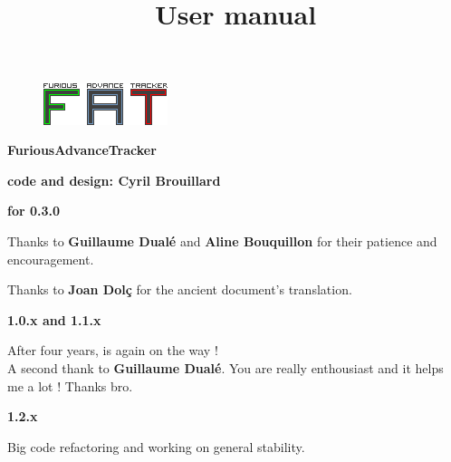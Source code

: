 \documentclass[12pt,a4paper]{article}
\title{\bf \SimpleImage{images/furicat_color}{0.3} \\ User manual}
\author{\fatversion}
\begin{document}
  \begin{figure}
    \begin{center}
    \includegraphics[scale=2]{images/logo}
    \end{center}
  \end{figure}
  \maketitle{}
  \thispagestyle{empty}
  \setcounter{page}{0}
  \ClearShipoutPicture

  \newpage

  \begin{center}

  {\bf \FAT FuriousAdvanceTracker} \medskip

  {\bf code and design: Cyril Brouillard} \medskip

  {\bf for 0.3.0} \medskip

  Thanks to {\bf \textcolor{vert}{Guillaume Dualé}} and {\bf \textcolor{vert}{Aline Bouquillon}} for their patience and encouragement.\medskip

  Thanks to {\bf \textcolor{vert}{Joan Dolç}} for the ancient document's translation. \medskip

  {\bf 1.0.x and 1.1.x} \medskip

  After four years, \FAT is again on the way ! \\
  A second thank to {\bf \textcolor{vert}{Guillaume Dualé}}. You are really enthousiast and it helps me a lot ! Thanks bro.

  {\bf 1.2.x} \medskip

  Big code refactoring and working on general stability.


  \end{center}

  \thispagestyle{empty}
  \setcounter{page}{0}
  \ClearShipoutPicture
  \newpage
\end{document}
